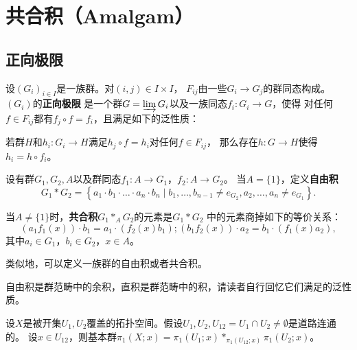 \newcommand{\edge}{\operatorname{edge}}
\newcommand{\vt}{\operatorname{vert}}
\newcommand{\rl}{\operatorname{real}}
\newcommand{\Path}{\operatorname{Path}}
\newcommand{\Circ}{\operatorname{Circ}}
\newcommand{\Stab}{\operatorname{Stab}}
\section{共合积（Amalgam）}
\subsection{正向极限}
\begin{definition}
    设$(G_i)_{i \in I}$是一族群。对$(i,j) \in I \times I$，
    $F_{ij}$由一些$G_i \to G_j$的群同态构成。$(G_i)$的\textbf{正向极限}
    是一个群$G = \varinjlim G_i$以及一族同态$f_i \colon G_i \to G$，使得
    对任何$f \in F_{ij}$都有$f_j \circ f = f_i$，且满足如下的泛性质：

    若群$H$和$h_i \colon G_i \to H$满足$h_j \circ f = h_i$对任何$f \in F_{ij}$，
    那么存在$h \colon G \to H$使得$h_i = h \circ f_i$。
\end{definition}
\begin{definition}
    设有群$G_1,G_2,A$以及群同态$f_1 \colon A \to G_1$，$f_2 \colon A \to G_2$。
    当$A = \{1\}$，定义\textbf{自由积}
    \[G_1 * G_2 = \left\{ a_1\cdot b_1 \cdot \ldots \cdot a_n \cdot b_n \mid b_1,\ldots,b_{n-1} \neq e_{G_2},a_2,\ldots,a_n \neq e_{G_1}\right\}.\]

    当$A \neq \{1\}$时，\textbf{共合积}$G_1 *_A G_2$的元素是$G_1*G_2$
    中的元素商掉如下的等价关系：\[\left( a_1f_1(x) \right)\cdot b_1 = a_1 \cdot \left( f_2(x)b_1 \right);\left( b_1f_2(x) \right)\cdot a_2 = b_1 \cdot \left( f_1(x)a_2 \right),\]
    其中$a_i \in G_1$，$b_i \in G_2$，$x \in A$。

    类似地，可以定义一族群的自由积或者共合积。
\end{definition}
\begin{remark}
    自由积是群范畴中的余积，直积是群范畴中的积，请读者自行回忆它们满足的泛性质。
\end{remark}
\begin{example}
设$X$是被开集$U_1,U_2$覆盖的拓扑空间。假设$U_1,U_2,U_{12} = U_1 \cap U_2 \neq \emptyset$是道路连通的。
设$x \in U_{12}$，则基本群$\pi_1(X;x) = \pi_1(U_1;x) *_{\pi_1(U_{12};x)} \pi_1(U_2;x)$。
\end{example}
